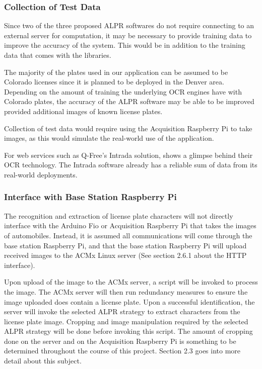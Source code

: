 \documentclass[11pt, oneside, fullpage, doublespace]{article}
\begin{document}
\subsubsection{Collection of Test Data}
Since two of the three proposed ALPR softwares do not require connecting to an external server for computation, it may be necessary to provide training data to improve the accuracy of the system. This would be in addition to the training data that comes with the libraries.

The majority of the plates used in our application can be assumed to be Colorado licenses since it is planned to be deployed in the Denver area. Depending on the amount of training the underlying OCR engines have with Colorado plates, the accuracy of the ALPR software may be able to be improved provided additional images of known license plates.

Collection of test data would require using the Acquisition Raspberry Pi to take images, as this would simulate the real-world use of the application.

For web services such as Q-Free's Intrada solution, \cite{intrada2014} shows a glimpse behind their OCR technology. The Intrada software already has a reliable sum of data from its real-world deployments.

\subsubsection{Interface with Base Station Raspberry Pi}
The recognition and extraction of license plate characters will not directly interface with the Arduino Fio or Acquisition Raspberry Pi that takes the images of automobiles. Instead, it is assumed all communications will come through the base station Raspberry Pi, and that the base station Raspberry Pi will upload received images to the ACMx Linux server (See section 2.6.1 about the HTTP interface).

Upon upload of the image to the ACMx server, a script will be invoked to process the image. The ACMx server will then run redundancy measures to ensure the image uploaded does contain a license plate. Upon a successful identification, the server will invoke the selected ALPR strategy to extract characters from the license plate image. Cropping and image manipulation required by the selected ALPR strategy will be done before invoking this script. The amount of cropping done on the server and on the Acquisition Raspberry Pi is something to be determined throughout the course of this project. Section 2.3 goes into more detail about this subject.
\end{document}
